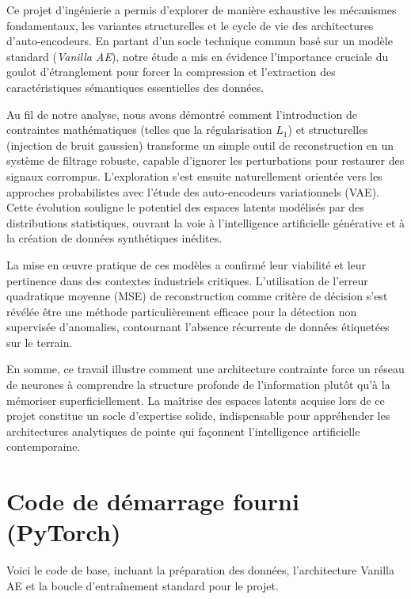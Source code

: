 \documentclass[11pt,a4paper]{report}
\begin{document}
Ce projet d'ingénierie a permis d'explorer de manière exhaustive les mécanismes fondamentaux, les variantes structurelles et le cycle de vie des architectures d'auto-encodeurs. En partant d'un socle technique commun basé sur un modèle standard (\textit{Vanilla AE}), notre étude a mis en évidence l'importance cruciale du goulot d'étranglement pour forcer la compression et l'extraction des caractéristiques sémantiques essentielles des données.

Au fil de notre analyse, nous avons démontré comment l'introduction de contraintes mathématiques (telles que la régularisation $L_1$) et structurelles (injection de bruit gaussien) transforme un simple outil de reconstruction en un système de filtrage robuste, capable d'ignorer les perturbations pour restaurer des signaux corrompus. L'exploration s'est ensuite naturellement orientée vers les approches probabilistes avec l'étude des auto-encodeurs variationnels (VAE). Cette évolution souligne le potentiel des espaces latents modélisés par des distributions statistiques, ouvrant la voie à l'intelligence artificielle générative et à la création de données synthétiques inédites.

La mise en œuvre pratique de ces modèles a confirmé leur viabilité et leur pertinence dans des contextes industriels critiques. L'utilisation de l'erreur quadratique moyenne (MSE) de reconstruction comme critère de décision s'est révélée être une méthode particulièrement efficace pour la détection non supervisée d'anomalies, contournant l'absence récurrente de données étiquetées sur le terrain. 

En somme, ce travail illustre comment une architecture contrainte force un réseau de neurones à comprendre la structure profonde de l'information plutôt qu'à la mémoriser superficiellement. La maîtrise des espaces latents acquise lors de ce projet constitue un socle d'expertise solide, indispensable pour appréhender les architectures analytiques de pointe qui façonnent l'intelligence artificielle contemporaine.

\appendix
\chapter{Code de démarrage fourni (PyTorch)}

Voici le code de base, incluant la préparation des données, l'architecture Vanilla AE et la boucle d'entraînement standard pour le projet.
\end{document}
